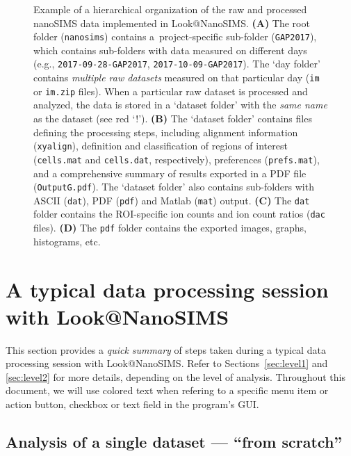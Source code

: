\documentclass[a4paper, 11pt]{article}
\newcommand{\ttt}[1]{\texttt{#1}}
\newcommand{\lans}[1]{{\color{magenta}#1}}
\newcommand{\lanscb}[1]{{\color{darkgreen}#1}}
\newcommand{\lanstf}[1]{{\color{cyan}#1}}
\newcounter{step}
\begin{document}
\begin{figure} [t!]
    \captionsetup{labelformat=adja-page}
    \ContinuedFloat
    \caption[Figure]{%
    Example of a hierarchical organization of the raw and processed nanoSIMS data implemented in Look@NanoSIMS. %
    \textbf{(A)} The root folder (\ttt{nanosims}) contains a~project-specific sub-folder (\ttt{GAP2017}), which contains sub-folders with data measured on different days (e.g., \ttt{2017-09-28-GAP2017}, \ttt{2017-10-09-GAP2017}). %
    The `day folder' contains \emph{multiple raw datasets} measured on that particular day (\ttt{im} or \ttt{im.zip} files). %
    When a particular raw dataset is processed and analyzed, the data is stored in a `dataset folder' with the \emph{same name} as the dataset (see red `!'). %
    \textbf{(B)} The `dataset folder' contains files defining the processing steps, including alignment information (\ttt{xyalign}), definition and classification of regions of interest (\ttt{cells.mat} and \ttt{cells.dat}, respectively), preferences (\ttt{prefs.mat}), and a comprehensive summary of results exported in a PDF file (\ttt{OutputG.pdf}). %
    The `dataset folder' also contains sub-folders with ASCII (\ttt{dat}), PDF (\ttt{pdf}) and Matlab (\ttt{mat}) output. %
    \textbf{(C)} The \ttt{dat} folder contains the ROI-specific ion counts and ion count ratios (\ttt{dac} files). %
    \textbf{(D)} The \ttt{pdf} folder contains the exported images, graphs, histograms, etc. }
    \label{fig2:data_organization}
\end{figure}


\clearpage

\section{A typical data processing session with Look@NanoSIMS}

This section provides a \emph{quick summary} of steps taken during a typical data processing session with Look@NanoSIMS. Refer to Sections~\ref{sec:level1} and \ref{sec:level2} for more details, depending on the level of analysis. Throughout this document, we will use colored text when refering to a specific \lans{menu item or action button}, \lanscb{checkbox} or \lanstf{text field} in the program's GUI.


\subsection{Analysis of a single dataset --- ``from scratch''}
\label{sec:analysis_from_scratch}
\end{document}
